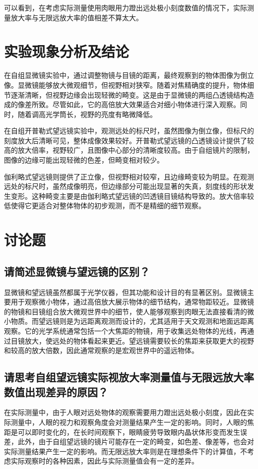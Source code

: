 \documentclass{ctexart}
\begin{document}
可以看到，在考虑实际测量使用肉眼用力蹬出远处极小刻度数值的情况下，实际测量放大率与无限远放大率的值相差不算太大。

\section{实验现象分析及结论}
在自组显微镜实验中，通过调整物镜与目镜的距离，最终观察到的物体图像为倒立像。显微镜能够放大微观细节，但视野相对狭窄。随着对焦精确度的提升，物体细节逐渐清晰，但视野边缘会出现轻微的畸变。这是由于显微镜的两组凸透镜结构造成的像差所致。尽管如此，它的高倍放大效果适合对细小物体进行深入观察。同时，随着调高光学筒长，视野的亮度有略微降低。

在自组开普勒式望远镜实验中，观测远处的标尺时，虽然图像为倒立像，但标尺的刻度放大后清晰可见，整体成像效果较好。开普勒式望远镜的凸透镜设计提供了较高的放大倍率，视野较广，且图像中心部分的清晰度较高。由于自组镜片的限制，图像的边缘可能出现轻微的色差，但畸变相对较少。

伽利略式望远镜则提供了正立像，但视野相对较窄，且边缘畸变较为明显。在观测远处的标尺时，虽然成像明亮，但边缘部分可能出现显著的失真，刻度线的形状发生变形。这种畸变主要是由伽利略式望远镜的凹透镜目镜结构导致的。放大倍率较低使得它更适合对整体物体的初步观测，而不是精细的细节观察。

\section{讨论题}

\subsection{请简述显微镜与望远镜的区别？}

显微镜和望远镜虽然都属于光学仪器，但其功能和设计目的有显著区别。显微镜主要用于观察微小物体，通过高倍放大展示物体的细节结构，通常物距较近。显微镜的物镜和目镜组合放大微观世界中的细节，使人能够观察到肉眼无法直接看清的微小物质。而望远镜则是为远距离观测而设计的，尤其适用于天文观测和地面远距离观察。它的光学系统通常包括一个大焦距的物镜，用于收集远处物体的光线，再通过目镜放大，使远处的物体看起来更近。望远镜需要较长的焦距来获取更大的视野和较高的放大倍数，因此通常观察的是宏观世界中的遥远物体。

\subsection{请思考自组望远镜实际视放大率测量值与无限远放大率数值出现差异的原因？}

在实际测量中，由于人眼对远处物体的观察需要用力蹬出远处极小刻度，因此在实际测量中，人眼的视力和观察角度会对测量结果产生一定的影响。同时，人眼的焦距是可以即时变化的，在长时间观察下，眼睛疲劳导致眼内晶状体形变而发生误差，此外，由于自组望远镜的镜片可能存在一定的畸变，如色差、像差等，也会对实际测量结果产生一定的影响。而无限远放大率则是在理想条件下的计算值，不考虑实际观察时的各种因素，因此与实际测量值会有一定的差异。
\end{document}
